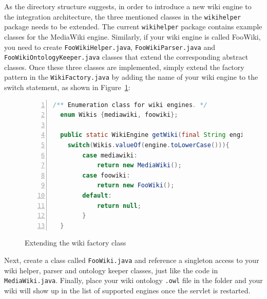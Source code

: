 As the directory structure suggests, in order to introduce a new wiki engine to the integration architecture, the three mentioned classes in the \texttt{wikihelper} package needs to be extended. The current \texttt{wikihelper} package contains example classes for the MediaWiki engine. Similarly, if your wiki engine is called FooWiki, you need to create \texttt{FooWikiHelper.java}, \texttt{FooWikiParser.java} and \texttt{FooWikiOntologyKeeper.java} classes that extend the corresponding abstract classes. Once these three classes are implemented, simply extend the factory pattern in the \texttt{WikiFactory.java} by adding the name of your wiki engine to the switch statement, as shown in Figure~\ref{list:wiki_factory_extend}:

\begin{figure}[h!]
\centering
\begin{lstlisting}[language=Java,numbers=left,xleftmargin=4mm,columns=flexible]
  /** Enumeration class for wiki engines. */
  enum Wikis {mediawiki, foowiki};

  public static WikiEngine getWiki(final String engine){
    switch(Wikis.valueOf(engine.toLowerCase())){
		case mediawiki:
			return new MediaWiki();
		case foowiki:
			return new FooWiki();
		default:
			return null;
		}
  }
\end{lstlisting}
\caption{Extending the wiki factory class}
\label{list:wiki_factory_extend}
\end{figure}

Next, create a class called \texttt{FooWiki.java} and reference a singleton access to your wiki helper, parser and ontology keeper classes, just like the code in \texttt{MediaWiki.java}. Finally, place your wiki ontology \texttt{.owl} file in the  folder and your wiki will show up in the list of supported engines once the servlet is restarted.
